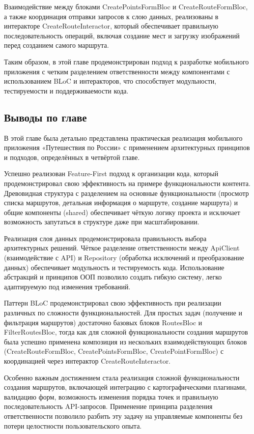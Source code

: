 Взаимодействие между блоками CreatePointsFormBloc и CreateRouteFormBloc, а также координация отправки запросов к слою данных, реализованы в интеракторе CreateRouteInteractor, который обеспечивает правильную последовательность операций, включая создание мест и загрузку изображений перед созданием самого маршрута.  

Таким образом, в этой главе продемонстрирован подход к разработке мобильного приложения с четким разделением ответственности между компонентами с использованием BLoC и интеракторов, что способствует модульности, тестируемости и поддерживаемости кода.

\subsection*{Выводы по главе}
В этой главе была детально представлена практическая реализация мобильного приложения «Путешествия по России» с применением архитектурных принципов и подходов, определённых в четвёртой главе.

Успешно реализован Feature-First подход к организации кода, который продемонстрировал свою эффективность на примере функциональности контента. Древовидная структура с разделением на основные функциональности (просмотр списка маршрутов, детальная информация о маршруте, создание маршрута) и общие компоненты (shared) обеспечивает чёткую логику проекта и исключает возможность запутаться в структуре даже при масштабировании.

Реализация слоя данных продемонстрировала правильность выбора архитектурных решений. Чёткое разделение ответственности между ApiClient (взаимодействие с API) и Repository (обработка исключений и преобразование данных) обеспечивает модульность и тестируемость кода. Использование абстракций и принципов ООП позволило создать гибкую систему, легко адаптируемую под изменения требований.

Паттерн BLoC продемонстрировал свою эффективность при реализации различных по сложности функциональностей. Для простых задач (получение и фильтрация маршрутов) достаточно базовых блоков RoutesBloc и FilterRoutesBloc, тогда как для сложной функциональности создания маршрутов была успешно применена композиция из нескольких взаимодействующих блоков (CreateRouteFormBloc, CreatePointsFormBloc, CreatePointFormBloc) с координацией через интерактор CreateRouteInteractor.

Особенно важным достижением стала реализация сложной функциональности создания маршрутов, включающей интеграцию с картографическими плагинами, валидацию форм, возможность изменения порядка точек и правильную последовательность API-запросов. Применение принципа разделения ответственности позволило разбить эту задачу на управляемые компоненты без потери целостности пользовательского опыта.

